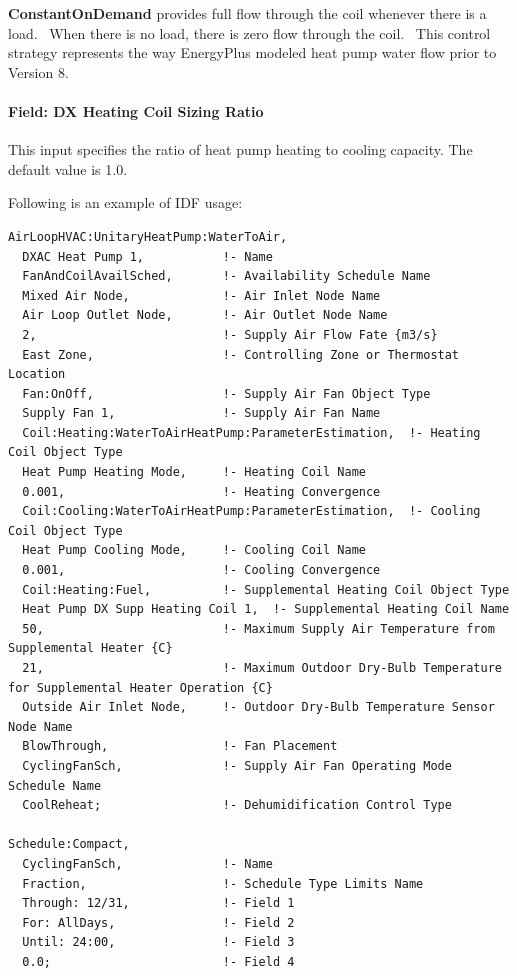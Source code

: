 \textbf{ConstantOnDemand} provides full flow through the coil whenever there is a load.~ When there is no load, there is zero flow through the coil.~ This control strategy represents the way EnergyPlus modeled heat pump water flow prior to Version 8.

\paragraph{Field: DX Heating Coil Sizing Ratio}\label{field-dx-heating-coil-sizing-ratio-0104}

This input specifies the ratio of heat pump heating to cooling capacity. The default value is 1.0.


Following is an example of IDF usage:

\begin{lstlisting}
AirLoopHVAC:UnitaryHeatPump:WaterToAir,
  DXAC Heat Pump 1,           !- Name
  FanAndCoilAvailSched,       !- Availability Schedule Name
  Mixed Air Node,             !- Air Inlet Node Name
  Air Loop Outlet Node,       !- Air Outlet Node Name
  2,                          !- Supply Air Flow Fate {m3/s}
  East Zone,                  !- Controlling Zone or Thermostat Location
  Fan:OnOff,                  !- Supply Air Fan Object Type
  Supply Fan 1,               !- Supply Air Fan Name
  Coil:Heating:WaterToAirHeatPump:ParameterEstimation,  !- Heating Coil Object Type
  Heat Pump Heating Mode,     !- Heating Coil Name
  0.001,                      !- Heating Convergence
  Coil:Cooling:WaterToAirHeatPump:ParameterEstimation,  !- Cooling Coil Object Type
  Heat Pump Cooling Mode,     !- Cooling Coil Name
  0.001,                      !- Cooling Convergence
  Coil:Heating:Fuel,          !- Supplemental Heating Coil Object Type
  Heat Pump DX Supp Heating Coil 1,  !- Supplemental Heating Coil Name
  50,                         !- Maximum Supply Air Temperature from Supplemental Heater {C}
  21,                         !- Maximum Outdoor Dry-Bulb Temperature for Supplemental Heater Operation {C}
  Outside Air Inlet Node,     !- Outdoor Dry-Bulb Temperature Sensor Node Name
  BlowThrough,                !- Fan Placement
  CyclingFanSch,              !- Supply Air Fan Operating Mode Schedule Name
  CoolReheat;                 !- Dehumidification Control Type

Schedule:Compact,
  CyclingFanSch,              !- Name
  Fraction,                   !- Schedule Type Limits Name
  Through: 12/31,             !- Field 1
  For: AllDays,               !- Field 2
  Until: 24:00,               !- Field 3
  0.0;                        !- Field 4


\end{lstlisting}
